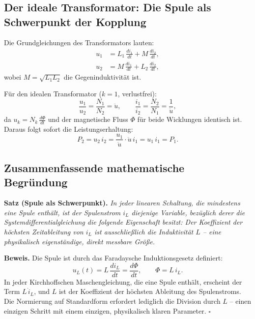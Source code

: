 ﻿\documentclass[12pt, a4paper]{article}
\begin{document}
	\subsection{Der ideale Transformator: Die Spule als Schwerpunkt der Kopplung}
	\label{sec:schwerpunkt_trafo}
	
	Die Grundgleichungen des Transformators lauten:
	\begin{align}
		u_1 &= L_1\,\frac{di_1}{dt} + M\,\frac{di_2}{dt}, \label{eq:trafo_prim} \\
		u_2 &= M\,\frac{di_1}{dt} + L_2\,\frac{di_2}{dt}, \label{eq:trafo_sek}
	\end{align}
	wobei $M = \sqrt{L_1 L_2}$ die Gegeninduktivität ist.
	
	Für den idealen Transformator ($k = 1$, verlustfrei):
	\begin{equation}
		\frac{u_1}{u_2} = \frac{N_1}{N_2} = \ddot{u}, \qquad
		\frac{i_1}{i_2} = \frac{N_2}{N_1} = \frac{1}{\ddot{u}},
		\label{eq:trafo_ue}
	\end{equation}
	da $u_k = N_k\,\frac{d\Phi}{dt}$ und der magnetische Fluss $\Phi$ für beide
	Wicklungen identisch ist. Daraus folgt sofort die Leistungserhaltung:
	\begin{equation}
		P_2 = u_2\,i_2 = \frac{u_1}{\ddot{u}} \cdot \ddot{u}\,i_1 = u_1\,i_1 = P_1.
	\end{equation}
	
	\subsection{Zusammenfassende mathematische Begründung}
	\label{sec:spule_schwerpunkt_begruendung}
	
	\textbf{Satz (Spule als Schwerpunkt).}
	\textit{In jeder linearen Schaltung, die mindestens eine Spule enthält,
		ist der Spulenstrom $i_L$ diejenige Variable, bezüglich derer die
		Systemdifferentialgleichung die folgende Eigenschaft besitzt: Der Koeffizient
		der höchsten Zeitableitung von $i_L$ ist ausschließlich die Induktivität $L$
		-- eine physikalisch eigenständige, direkt messbare Größe.}
	
	\textbf{Beweis.}
	Die Spule ist durch das Faradaysche Induktionsgesetz definiert:
	\begin{equation}
		u_L(t) = L\,\frac{di_L}{dt} = \frac{d\Phi}{dt},
		\qquad \Phi = L\,i_L.
		\label{eq:faraday}
	\end{equation}
	In jeder Kirchhoffschen Maschengleichung, die eine Spule enthält, erscheint der
	Term $L\,\dot{i}_L$, und $L$ ist der Koeffizient der höchsten Ableitung
	des Spulenstroms. Die Normierung auf Standardform erfordert lediglich die
	Division durch $L$ -- einen einzigen Schritt mit einem einzigen,
	physikalisch klaren Parameter. $\square$
	
\end{document}
